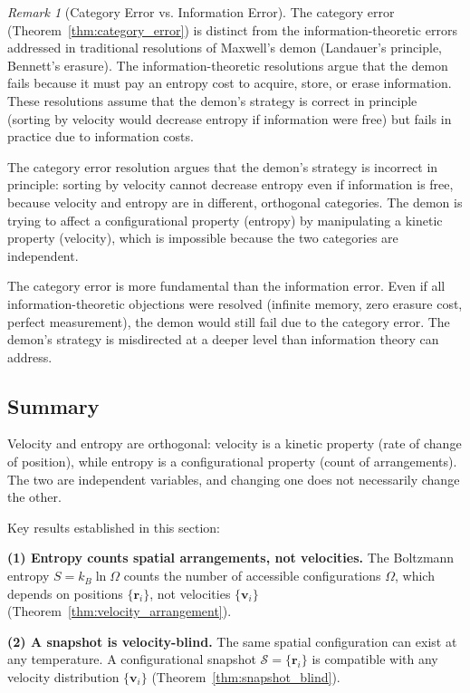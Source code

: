 \documentclass[12pt,a4paper]{article}
\theoremstyle{definition}
\theoremstyle{remark}
\newtheorem{remark}[theorem]{Remark}
\begin{document}
\begin{remark}[Category Error vs. Information Error]
\label{rem:category_vs_information}
The category error (Theorem~\ref{thm:category_error}) is distinct from the information-theoretic errors addressed in traditional resolutions of Maxwell's demon (Landauer's principle, Bennett's erasure). The information-theoretic resolutions argue that the demon fails because it must pay an entropy cost to acquire, store, or erase information. These resolutions assume that the demon's strategy is correct in principle (sorting by velocity would decrease entropy if information were free) but fails in practice due to information costs.

The category error resolution argues that the demon's strategy is incorrect in principle: sorting by velocity cannot decrease entropy even if information is free, because velocity and entropy are in different, orthogonal categories. The demon is trying to affect a configurational property (entropy) by manipulating a kinetic property (velocity), which is impossible because the two categories are independent.

The category error is more fundamental than the information error. Even if all information-theoretic objections were resolved (infinite memory, zero erasure cost, perfect measurement), the demon would still fail due to the category error. The demon's strategy is misdirected at a deeper level than information theory can address.
\end{remark}

\subsection{Summary}

Velocity and entropy are orthogonal: velocity is a kinetic property (rate of change of position), while entropy is a configurational property (count of arrangements). The two are independent variables, and changing one does not necessarily change the other.

Key results established in this section:

\textbf{(1) Entropy counts spatial arrangements, not velocities.} The Boltzmann entropy $S = k_B \ln \Omega$ counts the number of accessible configurations $\Omega$, which depends on positions $\{\mathbf{r}_i\}$, not velocities $\{\mathbf{v}_i\}$ (Theorem~\ref{thm:velocity_arrangement}).

\textbf{(2) A snapshot is velocity-blind.} The same spatial configuration can exist at any temperature. A configurational snapshot $\mathcal{S} = \{\mathbf{r}_i\}$ is compatible with any velocity distribution $\{\mathbf{v}_i\}$ (Theorem~\ref{thm:snapshot_blind}).
\end{document}
